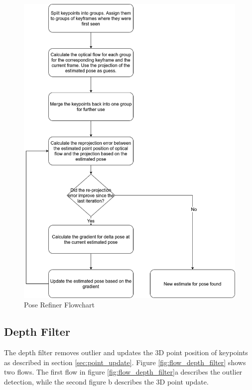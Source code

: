 \documentclass[11pt,a4paper,titlepage,oneside]{report}
\begin{document}
\begin{figure}[H]
  \centering
  \includegraphics[scale=0.3]{img/flow_pose_refiner.png}
  \caption{Pose Refiner Flowchart}\label{fig:flow_pose_refiner}
\end{figure}

\subsection{Depth Filter}\label{sec:depth_filter}

The depth filter removes outlier and updates the 3D point position of keypoints as described in section \ref{sec:point_update}. Figure \ref{fig:flow_depth_filter} shows two flows. The first flow in figure \ref{fig:flow_depth_filter}a describes the outlier detection, while the second figure b describes the 3D point update.
\end{document}
